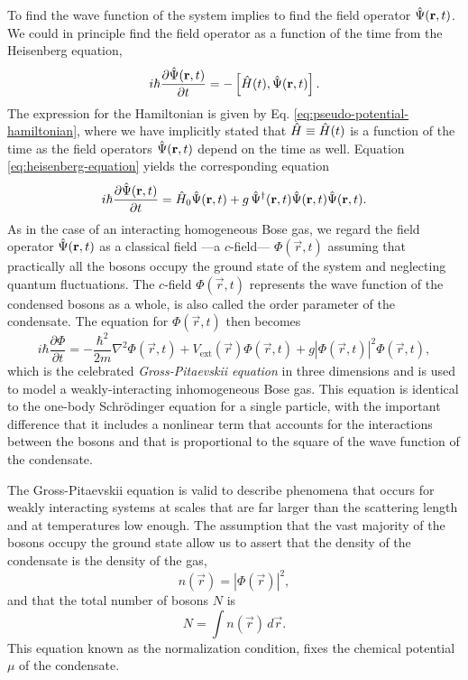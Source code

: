 To find the wave function of the system implies to find the field operator
${\hat{\Psi}}(\mathbf r, t)$. We could in principle find the field operator as a
function of the time from the Heisenberg equation,
%
\begin{equation}
  \label{eq:heisenberg-equation}
  i \hbar \frac{\partial {\hat{\Psi}}(\mathbf r, t)}{\partial t} = -\left[{\hat{H}}(t), {\hat{\Psi}}(\mathbf r, t)\right].
\end{equation}
%
The expression for the Hamiltonian is given by Eq.
\eqref{eq:pseudo-potential-hamiltonian}, where we have implicitly stated that
${\hat{H}} \equiv {\hat{H}}(t)$ is a function of the time as the field operators
${\hat{\Psi}}(\mathbf r, t)$ depend on the time as well. Equation
\eqref{eq:heisenberg-equation} yields the corresponding equation
%
\begin{equation}
  \label{eq:gross-pitaevskii-heisenberg-equation}
  i\hbar \frac{\partial {\hat{\Psi}}(\mathbf r, t)}{\partial t} = {\hat{H}}_0 {\hat{\Psi}}(\mathbf r, t) +
  g \, {\hat{\Psi}}^\dagger(\mathbf r, t) {\hat{\Psi}}(\mathbf r, t) {\hat{\Psi}}(\mathbf r, t).
\end{equation}
%
As in the case of an interacting homogeneous Bose gas, we regard the field
operator ${\hat{\Psi}}(\mathbf r, t)$ as a classical field ---a $c$-field---
$\Phi(\vec r, t)$ assuming that practically all the bosons occupy the ground
state of the system and neglecting quantum fluctuations. The $c$-field
$\Phi(\vec r, t)$ represents the  wave function of the condensed bosons as a
whole, is also called the order parameter of the condensate. The equation for
$\Phi(\vec r, t)$ then becomes
%
\begin{equation}
  \label{eq:gross-pitaevskii-equation-3d}
  i\hbar \frac{\partial \Phi}{\partial t} = -\frac{\hbar^2}{2m} \nabla^2 \Phi(\vec r, t) +
  V_\mathrm{ext}(\vec r) \Phi(\vec r, t) +
  g \left| \Phi(\vec r, t) \right|^2 \Phi(\vec r, t),
\end{equation}
%
which is the celebrated \textit{Gross-Pitaevskii equation}
\cite{bib:gross-il-nuovo-cimento.1961, bib:pitaevskii-jetp.1961} in three
dimensions and is used to model a weakly-interacting inhomogeneous Bose gas.
This equation is identical to the one-body Schrödinger equation for a single
particle, with the important difference that it includes a nonlinear term that
accounts for the interactions between the bosons and that is proportional to the
square of the wave function of the condensate.

The Gross-Pitaevskii equation is valid to describe phenomena that occurs for
weakly interacting systems at scales that are far larger than the scattering
length and at temperatures low enough. The assumption that the vast majority of
the bosons occupy the ground state allow us to assert that the density of the
condensate is the density of the gas,
%
\begin{equation}
  \textit{}   n(\vec r) = \left| \Phi(\vec r) \right|^2,
\end{equation}
%
and that the total number of bosons $N$ is
%
\begin{equation}
  N = \int n(\vec r) \, d\vec r.
\end{equation}
%
This equation known as the normalization condition, fixes the chemical potential
$\mu$ of the condensate.


